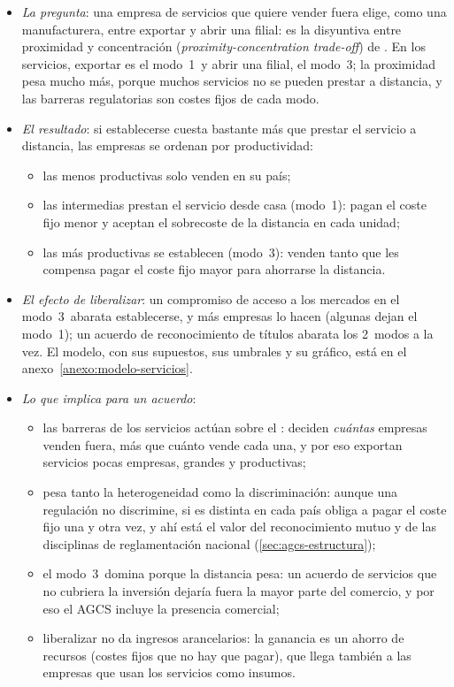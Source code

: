 \documentclass[11pt]{article}
\begin{document}
\begin{itemize}
\item \emph{La pregunta}: una empresa de servicios que quiere vender fuera elige, como una manufacturera, entre exportar y abrir una filial: es la disyuntiva entre proximidad y concentración (\emph{proximity-concentration trade-off}) de \textcite{HelpmanMelitzYeaple2004Export} . En los servicios, exportar es el modo~1~y abrir una filial, el modo~3; la proximidad pesa mucho más, porque muchos servicios no se pueden prestar a distancia, y las barreras regulatorias son costes fijos de cada modo\nocite{KoxNordas2007Services,FrancoisHoekman2010Services}.
\item \emph{El resultado}: si establecerse cuesta bastante más que prestar el servicio a distancia, las empresas se ordenan por productividad:
  \begin{itemize}
  \item las menos productivas solo venden en su país;
  \item las intermedias prestan el servicio desde casa (modo~1): pagan el coste fijo menor y aceptan el sobrecoste de la distancia en cada unidad;
  \item las más productivas se establecen (modo~3): venden tanto que les compensa pagar el coste fijo mayor para ahorrarse la distancia.
  \end{itemize}
\item \emph{El efecto de liberalizar}: un compromiso de acceso a los mercados en el modo~3~abarata establecerse, y más empresas lo hacen (algunas dejan el modo~1); un acuerdo de reconocimiento de títulos abarata los 2~modos a la vez. El modelo, con sus supuestos, sus umbrales y su gráfico, está en el anexo~\ref{anexo:modelo-servicios}.
\item \emph{Lo que implica para un acuerdo}:
  \begin{itemize}
  \item las barreras de los servicios actúan sobre el : deciden \emph{cuántas} empresas venden fuera, más que cuánto vende cada una, y por eso exportan servicios pocas empresas, grandes y productivas;
  \item pesa tanto la heterogeneidad como la discriminación: aunque una regulación no discrimine, si es distinta en cada país obliga a pagar el coste fijo una y otra vez, y ahí está el valor del reconocimiento mutuo y de las disciplinas de reglamentación nacional (\ref{sec:agcs-estructura});
  \item el modo~3~domina porque la distancia pesa: un acuerdo de servicios que no cubriera la inversión dejaría fuera la mayor parte del comercio, y por eso el AGCS incluye la presencia comercial;
  \item liberalizar no da ingresos arancelarios: la ganancia es un ahorro de recursos (costes fijos que no hay que pagar), que llega también a las empresas que usan los servicios como insumos.
  \end{itemize}
\end{itemize}
\end{document}
